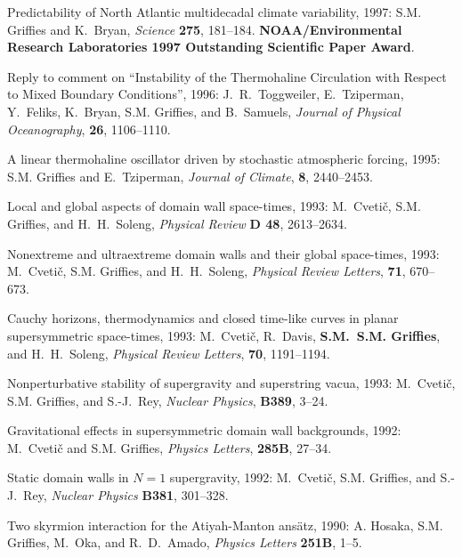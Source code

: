 \begin{etaremune}
\item Predictability of North Atlantic multidecadal climate
  variability, 1997: S.M. Grif\/f\/ies and K.\ Bryan, {\em
    Science} {\bf 275}, 181--184. {\bf NOAA/Environmental
    Research Laboratories 1997 Outstanding Scientific Paper Award}.
 
\item Reply to comment on ``Instability of the Thermohaline
Circulation with Respect to Mixed Boundary Conditions'', 1996: J.\ R.\
Toggweiler, E.\ Tziperman, Y.\ Feliks, K.\ Bryan, S.M. Grif\/f\/ies, and B.\ Samuels, {\em Journal of Physical
Oceanography}, {\bf 26}, 1106--1110.
  
\item A linear thermohaline oscillator driven by stochastic
atmospheric forcing, 1995: S.M. Grif\/f\/ies and E.\ Tziperman,
{\em Journal of Climate}, {\bf 8}, 2440--2453.

\item Local and global aspects of domain wall space-times, 1993: M.\
Cveti\v c, S.M. Grif\/f\/ies, and H.\ H.\ Soleng, {\em Physical
Review} {\bf D 48}, 2613--2634.

\item Nonextreme and ultraextreme domain walls and their global
space-times, 1993: M.\ Cveti\v c, S.M. Grif\/f\/ies, and H.\
H.\ Soleng, {\em Physical Review Letters}, {\bf 71}, 670--673.

\item Cauchy horizons, thermodynamics and closed time-like curves in
planar supersymmetric space-times, 1993: M.\ Cveti\v c, R.\ Davis, {\bf
S.M.\ S.M. Grif\/f\/ies}, and H.\ H.\ Soleng, {\em Physical Review
Letters}, {\bf 70}, 1191--1194.
                                                                 
\item Nonperturbative stability of supergravity and superstring vacua, 1993:
M.\ Cveti\v c, S.M. Grif\/f\/ies, and S.-J.\ Rey, {\em Nuclear
Physics}, {\bf B389}, 3--24.
 
\item Gravitational effects in supersymmetric domain wall
backgrounds, 1992: M.\ Cveti\v c and S.M. Grif\/f\/ies, {\em
Physics Letters}, {\bf 285B}, 27--34.

\item Static domain walls in $N=1$ supergravity, 1992: M.\ Cveti\v
c, S.M. Grif\/f\/ies, and S.-J.\ Rey, {\em Nuclear Physics}
{\bf B381}, 301--328.

\item Two skyrmion interaction for the Atiyah-Manton ans\"atz, 1990: 
A. Hosaka, S.M. Grif\/f\/ies, M.\ Oka, and R.\ D.\ Amado, {\em
Physics Letters} {\bf 251B}, 1--5.


\end{etaremune}

